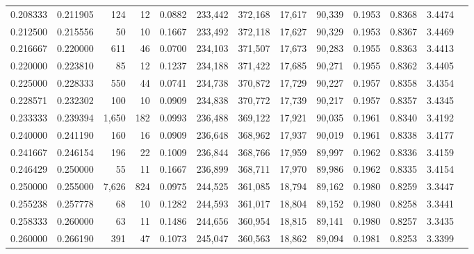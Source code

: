 \begin{tabular}{rrrrrrrrrrrrr}
0.208333 & 0.211905 &    124 &     12 &                                     0.0882 & 233,442 & 372,168 &  17,617 &  90,339 & 0.1953 & 0.8368 & 3.4474 \\
0.212500 & 0.215556 &     50 &     10 &                                     0.1667 & 233,492 & 372,118 &  17,627 &  90,329 & 0.1953 & 0.8367 & 3.4469 \\
0.216667 & 0.220000 &    611 &     46 &                                     0.0700 & 234,103 & 371,507 &  17,673 &  90,283 & 0.1955 & 0.8363 & 3.4413 \\
0.220000 & 0.223810 &     85 &     12 &                                     0.1237 & 234,188 & 371,422 &  17,685 &  90,271 & 0.1955 & 0.8362 & 3.4405 \\
0.225000 & 0.228333 &    550 &     44 &                                     0.0741 & 234,738 & 370,872 &  17,729 &  90,227 & 0.1957 & 0.8358 & 3.4354 \\
0.228571 & 0.232302 &    100 &     10 &                                     0.0909 & 234,838 & 370,772 &  17,739 &  90,217 & 0.1957 & 0.8357 & 3.4345 \\
0.233333 & 0.239394 &  1,650 &    182 &                                     0.0993 & 236,488 & 369,122 &  17,921 &  90,035 & 0.1961 & 0.8340 & 3.4192 \\
0.240000 & 0.241190 &    160 &     16 &                                     0.0909 & 236,648 & 368,962 &  17,937 &  90,019 & 0.1961 & 0.8338 & 3.4177 \\
0.241667 & 0.246154 &    196 &     22 &                                     0.1009 & 236,844 & 368,766 &  17,959 &  89,997 & 0.1962 & 0.8336 & 3.4159 \\
0.246429 & 0.250000 &     55 &     11 &                                     0.1667 & 236,899 & 368,711 &  17,970 &  89,986 & 0.1962 & 0.8335 & 3.4154 \\
0.250000 & 0.255000 &  7,626 &    824 &                                     0.0975 & 244,525 & 361,085 &  18,794 &  89,162 & 0.1980 & 0.8259 & 3.3447 \\
0.255238 & 0.257778 &     68 &     10 &                                     0.1282 & 244,593 & 361,017 &  18,804 &  89,152 & 0.1980 & 0.8258 & 3.3441 \\
0.258333 & 0.260000 &     63 &     11 &                                     0.1486 & 244,656 & 360,954 &  18,815 &  89,141 & 0.1980 & 0.8257 & 3.3435 \\
0.260000 & 0.266190 &    391 &     47 &                                     0.1073 & 245,047 & 360,563 &  18,862 &  89,094 & 0.1981 & 0.8253 & 3.3399 \\

\end{tabular}
